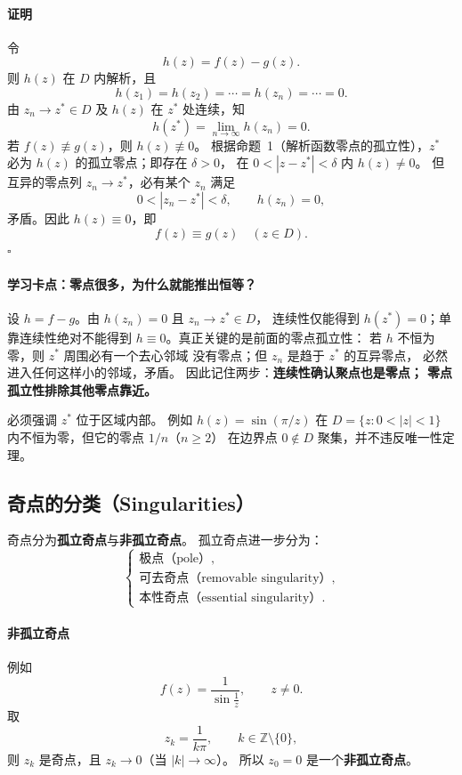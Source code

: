 \paragraph{证明}
令
\[
  h(z)=f(z)-g(z).
\]
则 $h(z)$ 在 $D$ 内解析，且
\[
  h(z_1)=h(z_2)=\cdots=h(z_n)=\cdots=0.
\]
由 $z_n\to z^*\in D$ 及 $h(z)$ 在 $z^*$ 处连续，知
\[
  h(z^*)=\lim_{n\to\infty}h(z_n)=0.
\]
若 $f(z)\not\equiv g(z)$，则 $h(z)\not\equiv0$。
根据命题~1（解析函数零点的孤立性），$z^*$ 必为
$h(z)$ 的孤立零点；即存在 $\delta>0$，
在 $0<|z-z^*|<\delta$ 内 $h(z)\ne0$。
但互异的零点列 $z_n\to z^*$，必有某个 $z_n$ 满足
\[
  0<|z_n-z^*|<\delta,\qquad h(z_n)=0,
\]
矛盾。因此 $h(z)\equiv0$，即
\[
  \boxed{f(z)\equiv g(z)\quad(z\in D).}
\]
\hfill$\square$



\paragraph{学习卡点：零点很多，为什么就能推出恒等？}
设 $h=f-g$。由 $h(z_n)=0$ 且 $z_n\to z^*\in D$，
连续性仅能得到 $h(z^*)=0$；单靠连续性绝对不能得到
$h\equiv0$。真正关键的是前面的零点孤立性：
若 $h$ 不恒为零，则 $z^*$ 周围必有一个去心邻域
没有零点；但 $z_n$ 是趋于 $z^*$ 的互异零点，
必然进入任何这样小的邻域，矛盾。
因此记住两步：\textbf{连续性确认聚点也是零点；
零点孤立性排除其他零点靠近。}

必须强调 $z^*$ 位于区域内部。
例如 $h(z)=\sin(\pi/z)$ 在 $D=\{z:0<|z|<1\}$
内不恒为零，但它的零点 $1/n$（$n\ge2$）
在边界点 $0\notin D$ 聚集，并不违反唯一性定理。


\subsection*{奇点的分类（Singularities）}

奇点分为\textbf{孤立奇点}与\textbf{非孤立奇点}。
孤立奇点进一步分为：
\[
  \left\{
  \begin{array}{l}
    \text{极点（pole）},\\
    \text{可去奇点（removable singularity）},\\
    \text{本性奇点（essential singularity）}.
  \end{array}
  \right.
\]

\paragraph{非孤立奇点}
例如
\[
  f(z)=\frac{1}{\sin\frac{1}{z}},\qquad z\ne 0.
\]
取
\[
  z_k=\frac{1}{k\pi},\qquad k\in\mathbb Z\setminus\{0\},
\]
则 $z_k$ 是奇点，且 $z_k\to0$（当 $|k|\to\infty$）。
所以 $z_0=0$ 是一个\textbf{非孤立奇点}。

